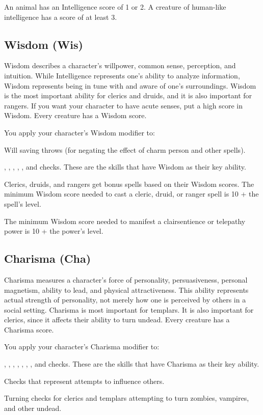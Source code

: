 An animal has an Intelligence score of 1 or 2. A creature of human-like intelligence has a score of at least 3.

\subsection{Wisdom (Wis)}
Wisdom describes a character's willpower, common sense, perception, and intuition. While Intelligence represents one's ability to analyze information, Wisdom represents being in tune with and aware of one's surroundings. Wisdom is the most important ability for clerics and druids, and it is also important for rangers. If you want your character to have acute senses, put a high score in Wisdom. Every creature has a Wisdom score.

You apply your character's Wisdom modifier to:
\begin{itemize*}
\item Will saving throws (for negating the effect of charm person and other spells).
\item {}, , , , , and  checks. These are the skills that have Wisdom as their key ability.
\end{itemize*}

Clerics, druids, and rangers get bonus spells based on their Wisdom scores. The minimum Wisdom score needed to cast a cleric, druid, or ranger spell is 10 + the spell's level.

The minimum Wisdom score needed to manifest a clairsentience or telepathy power is 10 + the power's level.

\subsection{Charisma (Cha)}
Charisma measures a character's force of personality, persuasiveness, personal magnetism, ability to lead, and physical attractiveness. This ability represents actual strength of personality, not merely how one is perceived by others in a social setting. Charisma is most important for templars. It is also important for clerics, since it affects their ability to turn undead. Every creature has a Charisma score.

You apply your character's Charisma modifier to:
\begin{itemize*}
\item {}, , , , , , , and  checks. These are the skills that have Charisma as their key ability.
\item Checks that represent attempts to influence others.
\item Turning checks for clerics and templars attempting to turn zombies, vampires, and other undead.
\end{itemize*}

